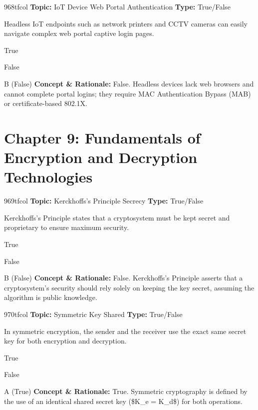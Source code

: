 \begin{qcard}{968}{tfcol}
\textcolor{darkslate!75}{\small\textbf{Topic:} IoT Device Web Portal Authentication \hfill \textbf{Type:} True/False}\vspace{0.4em}\par
Headless IoT endpoints such as network printers and CCTV cameras can easily navigate complex web portal captive login pages.
\begin{qoptions}
\item True
\item False
\end{qoptions}
\end{qcard}
\nopagebreak
\begin{explainbox}{B (False)}
\textbf{Concept \& Rationale:} False. Headless devices lack web browsers and cannot complete portal logins; they require MAC Authentication Bypass (MAB) or certificate-based 802.1X.
\end{explainbox}

\section{Chapter 9: Fundamentals of Encryption and Decryption Technologies}

\begin{qcard}{969}{tfcol}
\textcolor{darkslate!75}{\small\textbf{Topic:} Kerckhoffs's Principle Secrecy \hfill \textbf{Type:} True/False}\vspace{0.4em}\par
Kerckhoffs's Principle states that a cryptosystem must be kept secret and proprietary to ensure maximum security.
\begin{qoptions}
\item True
\item False
\end{qoptions}
\end{qcard}
\nopagebreak
\begin{explainbox}{B (False)}
\textbf{Concept \& Rationale:} False. Kerckhoffs's Principle asserts that a cryptosystem's security should rely solely on keeping the key secret, assuming the algorithm is public knowledge.
\end{explainbox}

\begin{qcard}{970}{tfcol}
\textcolor{darkslate!75}{\small\textbf{Topic:} Symmetric Key Shared \hfill \textbf{Type:} True/False}\vspace{0.4em}\par
In symmetric encryption, the sender and the receiver use the exact same secret key for both encryption and decryption.
\begin{qoptions}
\item True
\item False
\end{qoptions}
\end{qcard}
\nopagebreak
\begin{explainbox}{A (True)}
\textbf{Concept \& Rationale:} True. Symmetric cryptography is defined by the use of an identical shared secret key (\$K\_e = K\_d\$) for both operations.
\end{explainbox}


